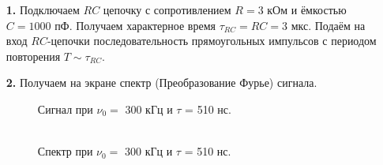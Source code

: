 \documentclass[a4paper,12pt]{article}
\begin{document}
\begin{enumerate}


\item [\textbf{1.}] Подключаем $RC$ цепочку с сопротивлением $R = 3$ кОм и ёмкостью $C = 1000$ пФ. Получаем характерное время $\tau_{RC} = RC = 3 $ мкс. Подаём на вход $RC$-цепочки последовательность прямоугольных импульсов с периодом повторения $T \sim \tau_{RC}$.


\item [\textbf{2.}] Получаем на экране спектр (Преобразование Фурье) сигнала.

\begin{figure}[h]
\begin{minipage}[h]{0.44\linewidth}
 Сигнал при $\nu_0 = $ 300 кГц и $\tau$ = 510 нс.  \\
\end{minipage}
\hfill
\begin{minipage}[h]{0.44\linewidth}
 \\  Спектр при $\nu_0 = $ 300 кГц и $\tau$ = 510 нс.

\end{minipage}
\end{figure}
\end{enumerate}
\end{document}
